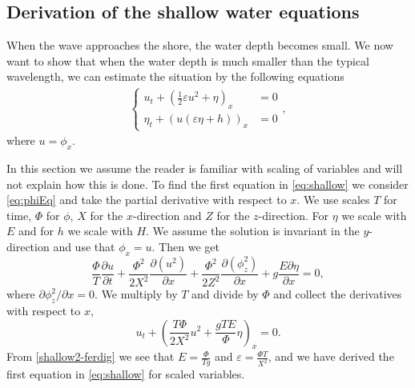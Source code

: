 \documentclass[11pt]{article}
\begin{document}
\subsection{Derivation of the shallow water equations}
When the wave approaches the shore, the water depth becomes small. We now want to show that when the water depth is much smaller than the typical wavelength, we can estimate the situation by the following equations 
\begin{align}
    \label{eq:shallow}
    \begin{cases}
	    u_t + \left(\frac{1}{2}\varepsilon u^2 + \eta\right)_x & = 0 \\
	    \eta_t + (u(\varepsilon\eta + h))_x & = 0
	\end{cases},
\end{align}
where $u = \phi_x$. 

In this section we assume the reader is familiar with scaling of variables and will not explain how this is done. To find the first equation in \eqref{eq:shallow} we consider \eqref{eq:phiEq} and take the partial derivative
with respect to $x$. We use scales $T$ for time, $\Phi$ for $\phi$, $X$ for the $x$-direction and $Z$ for the $z$-direction. For $\eta$ we scale with $E$ and for $h$ we scale with $H$. We assume the solution is
invariant in the $y$-direction and use that $\phi_x=u$. Then we get 
\begin{equation*}
\frac{\Phi}{T}\frac{\partial u}{\partial t} + \frac{\Phi^2}{2X^2}\frac{\partial (u^2)}{\partial x}+ \frac{\Phi^2}{2Z^2}\frac{\partial(\phi_z^2)}{\partial x} + g\frac{E \partial \eta}{\partial x} = 0,
\end{equation*}
where $\partial\phi_z^2/\partial x=0$. We multiply by $T$ and divide by $\Phi$ and collect the derivatives with respect to $x$,
\begin{equation}
    \label{shallow2-ferdig}
    u_t + \left(\frac{T\Phi}{2X^2}u^2 + \frac{gTE}{\Phi}\eta\right)_x = 0.
\end{equation}
From \eqref{shallow2-ferdig} we see that $E = \frac{\Phi}{T g}$ and $\varepsilon =\frac{\Phi T}{X^2}$, and we have derived the first equation in \eqref{eq:shallow} for scaled variables.
\end{document}
